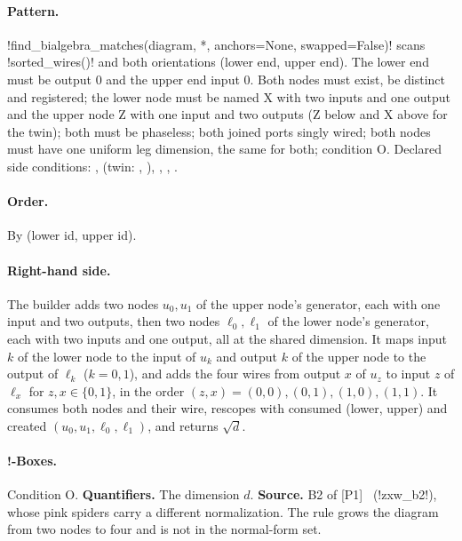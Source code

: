 \paragraph{Pattern.} \py!find_bialgebra_matches(diagram, *, anchors=None, swapped=False)! scans \py!sorted_wires()! and both orientations (lower end, upper end). The lower end must be output 0 and the upper end input 0. Both nodes must exist, be distinct and registered; the lower node must be named X with two inputs and one output and the upper node Z with one input and two outputs (Z below and X above for the twin); both must be phaseless; both joined ports singly wired; both nodes must have one uniform leg dimension, the same for both; condition O. Declared side conditions: ,  (twin: , ), , , .

\paragraph{Order.} By (lower id, upper id).

\paragraph{Right-hand side.} The builder adds two nodes $u_0,u_1$ of the upper node's generator, each with one input and two outputs, then two nodes $\ell_0,\ell_1$ of the lower node's generator, each with two inputs and one output, all at the shared dimension. It maps input $k$ of the lower node to the input of $u_k$ and output $k$ of the upper node to the output of $\ell_k$ ($k=0,1$), and adds the four wires from output $x$ of $u_z$ to input $z$ of $\ell_x$ for $z,x\in\{0,1\}$, in the order $(z,x)=(0,0),(0,1),(1,0),(1,1)$. It consumes both nodes and their wire, rescopes with consumed (lower, upper) and created $(u_0,u_1,\ell_0,\ell_1)$, and returns $\sqrt d$.

\paragraph{!-Boxes.} Condition O. \textbf{Quantifiers.} The dimension $d$. \textbf{Source.} B2 of [P1]~\cite{poor2023zxw} (\py!zxw_b2!), whose pink spiders carry a different normalization. The rule grows the diagram from two nodes to four and is not in the normal-form set.

